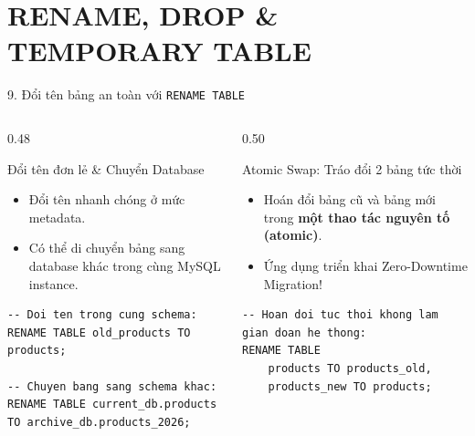 \documentclass[aspectratio=169,11pt]{beamer}
\newcommand{\kw}[1]{\textcolor{dbblue}{\textbf{#1}}}
\begin{document}
\section{RENAME, DROP \& TEMPORARY TABLE}
\begin{frame}[fragile]{9. Đổi tên bảng an toàn với \texttt{RENAME TABLE}}
\begin{columns}[t]
  \begin{column}{0.48\textwidth}
    \begin{block}{Đổi tên đơn lẻ \& Chuyển Database}
      \begin{itemize}\setlength{\itemsep}{1.5pt}
        \item Đổi tên nhanh chóng ở mức metadata.
        \item Có thể di chuyển bảng sang database khác trong cùng MySQL instance.
      \end{itemize}
    \end{block}
\begin{lstlisting}
-- Doi ten trong cung schema:
RENAME TABLE old_products TO products;

-- Chuyen bang sang schema khac:
RENAME TABLE current_db.products 
TO archive_db.products_2026;
\end{lstlisting}
  \end{column}
  \begin{column}{0.50\textwidth}
    \begin{block}{Atomic Swap: Tráo đổi 2 bảng tức thời}
      \begin{itemize}\setlength{\itemsep}{1.5pt}
        \item Hoán đổi bảng cũ và bảng mới trong \kw{một thao tác nguyên tố (atomic)}.
        \item Ứng dụng triển khai Zero-Downtime Migration!
      \end{itemize}
    \end{block}
\begin{lstlisting}
-- Hoan doi tuc thoi khong lam gian doan he thong:
RENAME TABLE 
    products TO products_old,
    products_new TO products;
\end{lstlisting}
  \end{column}
\end{columns}
\end{frame}
\end{document}
